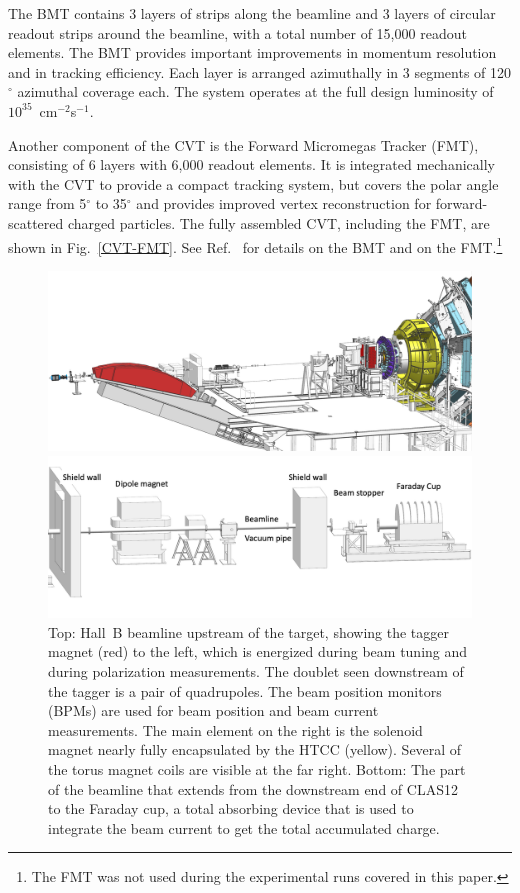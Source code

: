 \documentclass[final,3p,twocolumn]{elsarticle}
\begin{document}
The BMT contains 3 layers of strips along the beamline and 3 layers of circular readout strips around the beamline,
with a total number of 15,000 readout elements. The BMT provides important improvements in momentum resolution
and in tracking efficiency. Each layer is arranged azimuthally in 3 segments of 120$^\circ$ azimuthal coverage each.
The system operates at the full design luminosity of $10^{35}$~cm$^{-2}$s$^{-1}$.

Another component of the CVT is the Forward Micromegas Tracker (FMT), consisting of 6 layers with 6,000 readout
elements. It  is integrated mechanically with the CVT to provide a compact tracking system, but covers the polar angle
range from 5$^\circ$ to 35$^\circ$ and provides improved vertex reconstruction for forward-scattered charged
particles. The fully assembled CVT, including the FMT, are shown in Fig.~\ref{CVT-FMT}. See Ref.~\cite{BMT} for
details on the BMT and on the FMT.\footnote{The FMT was not used during the experimental runs covered in this paper.}  

\begin{figure}[t!]
\centerline{\includegraphics[width=2.0\columnwidth]{beamline-1.png}}
\centerline{\includegraphics[width=1.3\columnwidth]{beamline-3.png}}
\caption{Top: Hall~B beamline upstream of the target, showing the tagger magnet (red) to the left, which is energized
  during beam tuning and during polarization measurements. The doublet seen downstream of the tagger is a pair of
  quadrupoles. The beam position monitors (BPMs) are used for beam position and beam current measurements. The
  main element on the right is the solenoid magnet nearly fully encapsulated by the HTCC (yellow). Several of the torus
  magnet coils are visible at the far right. Bottom: The part of the beamline that extends from the downstream end of
  CLAS12 to the Faraday cup, a total absorbing device that is used to integrate the beam current to get the total
  accumulated charge.}
\label{beamline}
\end{figure}
\end{document}
